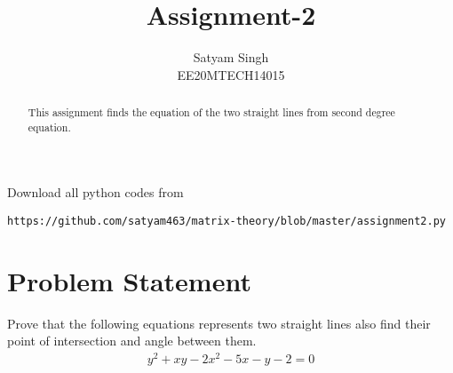 \documentclass[journal,12pt,twocolumn]{IEEEtran}
\begin{document}
\renewcommand{\thefigure}{\theproblem}
\def\putbox#1#2#3{\makebox[0in][l]{\makebox[#1][l]{}\raisebox{\baselineskip}[0in][0in]{\raisebox{#2}[0in][0in]{#3}}}}
     \def\rightbox#1{\makebox[0in][r]{#1}}
     \def\centbox#1{\makebox[0in]{#1}}
     \def\topbox#1{\raisebox{-\baselineskip}[0in][0in]{#1}}
     \def\midbox#1{\raisebox{-0.5\baselineskip}[0in][0in]{#1}}
\vspace{3cm}
\title{Assignment-2}
\author{Satyam Singh \\ EE20MTECH14015}
\maketitle
\newpage
\bigskip
\renewcommand{\thefigure}{\theenumi}
\renewcommand{\thetable}{\theenumi}
\begin{abstract}
This assignment finds the equation of the two straight lines from second degree  equation.
\end{abstract}
Download all python codes from 
\begin{lstlisting}
https://github.com/satyam463/matrix-theory/blob/master/assignment2.py
\end{lstlisting}
\section{Problem Statement}
Prove that the following equations represents two straight lines also find their point of intersection and angle between them.
\begin{align}
y^2+xy-2x^2-5x-y-2=0
\end{align}
\end{document}
